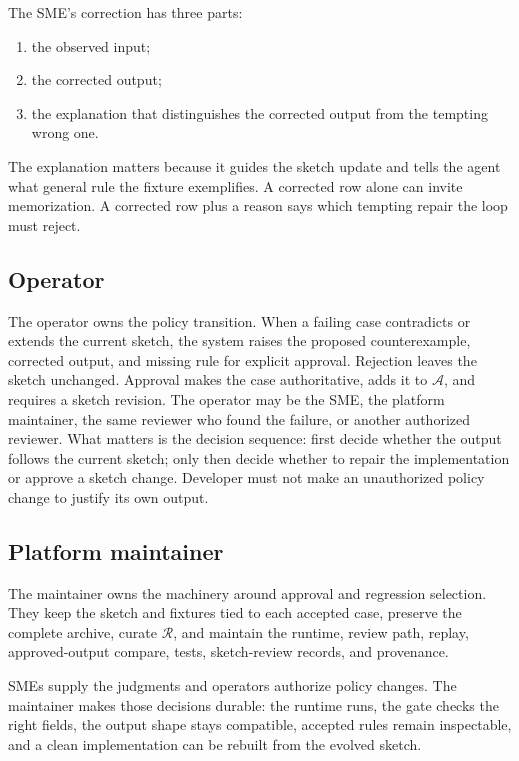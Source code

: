 \documentclass[11pt]{article}
\newcommand{\archive}{\mathcal{A}}
\newcommand{\regression}{\mathcal{R}}
\begin{document}
The SME's correction has three parts:

\begin{enumerate}
  \item the observed input;
  \item the corrected output;
  \item the explanation that distinguishes the corrected output from the tempting wrong one.
\end{enumerate}

The explanation matters because it guides the sketch update and tells the agent what
general rule the fixture exemplifies.  A corrected row alone can invite memorization.  A
corrected row plus a reason says which tempting repair the loop must reject.

\subsection{Operator}

The operator owns the policy transition.  When a failing case contradicts or extends the current
sketch, the system raises the proposed counterexample, corrected output, and missing rule for
explicit approval.  Rejection leaves the sketch unchanged.  Approval makes the case
authoritative, adds it to $\archive$, and requires a sketch revision.  The operator may be the
SME, the platform maintainer, the same reviewer who found the failure, or another authorized
reviewer.  What matters is the decision sequence: first decide whether the output follows the
current sketch; only then decide whether to repair the implementation or approve a sketch change.
Developer must not make an unauthorized policy change to justify its own output.

\subsection{Platform maintainer}

The maintainer owns the machinery around approval and regression selection.  They keep the
sketch and fixtures tied to each accepted case, preserve the complete archive, curate
$\regression$, and maintain the runtime, review path, replay, approved-output compare, tests,
sketch-review records, and provenance.

SMEs supply the judgments and operators authorize policy changes.  The maintainer makes those
decisions durable: the runtime runs, the gate checks the right fields, the output shape stays
compatible, accepted rules remain inspectable, and a clean implementation can be rebuilt from
the evolved sketch.
\end{document}
